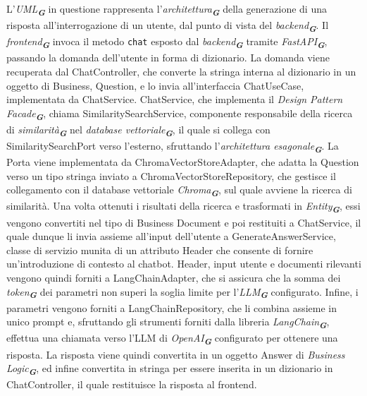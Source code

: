 L'\emph{UML}\textsubscript{\textbf{\textit{G}}} in questione rappresenta l'\emph{architettura}\textsubscript{\textbf{\textit{G}}} della generazione di una risposta all'interrogazione di un utente, dal punto di vista del \emph{backend}\textsubscript{\textbf{\textit{G}}}.
Il \emph{frontend}\textsubscript{\textbf{\textit{G}}} invoca il metodo \texttt{chat} esposto dal \emph{backend}\textsubscript{\textbf{\textit{G}}} tramite \emph{FastAPI}\textsubscript{\textbf{\textit{G}}}, passando la domanda dell'utente in forma di dizionario.
La domanda viene recuperata dal ChatController, che converte la stringa interna al dizionario in un oggetto di Business, Question, e lo invia all'interfaccia ChatUseCase, implementata da ChatService.
ChatService, che implementa il \emph{Design Pattern} \emph{Facade}\textsubscript{\textbf{\textit{G}}}, chiama SimilaritySearchService, componente responsabile della ricerca di \emph{similarità}\textsubscript{\textbf{\textit{G}}} nel \emph{database vettoriale}\textsubscript{\textbf{\textit{G}}}, il quale si collega con SimilaritySearchPort verso l'esterno, sfruttando l'\emph{architettura esagonale}\textsubscript{\textbf{\textit{G}}}. La Porta viene implementata da ChromaVectorStoreAdapter, che adatta la Question verso un tipo stringa inviato a ChromaVectorStoreRepository, che gestisce il collegamento con il database vettoriale \emph{Chroma}\textsubscript{\textbf{\textit{G}}}, sul quale avviene la ricerca di similarità. Una volta ottenuti i risultati della ricerca e trasformati in \emph{Entity}\textsubscript{\textbf{\textit{G}}}, essi vengono convertiti nel tipo di Business Document e poi restituiti a ChatService, il quale dunque li invia assieme all'input dell'utente a GenerateAnswerService, classe di servizio munita di un attributo Header che consente di fornire un'introduzione di contesto al chatbot. Header, input utente e documenti rilevanti vengono quindi forniti a LangChainAdapter, che si assicura che la somma dei \emph{token}\textsubscript{\textbf{\textit{G}}} dei parametri non superi la soglia limite per l'\emph{LLM}\textsubscript{\textbf{\textit{G}}} configurato. Infine, i parametri vengono forniti a LangChainRepository, che li combina assieme in unico prompt e, sfruttando gli strumenti forniti dalla libreria \emph{LangChain}\textsubscript{\textbf{\textit{G}}}, effettua una chiamata verso l'LLM di \emph{OpenAI}\textsubscript{\textbf{\textit{G}}} configurato per ottenere una risposta. 
La risposta viene quindi convertita in un oggetto Answer di \emph{Business Logic}\textsubscript{\textbf{\textit{G}}}, ed infine convertita in stringa per essere inserita in un dizionario in ChatController, il quale restituisce la risposta al frontend.

